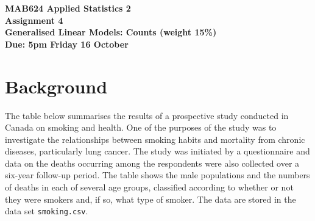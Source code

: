 \documentclass[11pt,a4paper]{article}
\begin{document}
\begin{center}
    \vspace*{0.35in}
    \huge\textbf{MAB624 Applied Statistics 2}\\
    \textbf{Assignment 4}\\
    \normalsize
    \vspace*{2em}
    \textbf{Generalised Linear Models: Counts (weight 15\%)}\\
    \textbf{Due: 5pm Friday 16 October}
\end{center}


\section*{Background}

The table below summarises the results of a prospective study conducted in Canada on smoking and health.  One of the purposes of the study was to investigate the relationships between smoking habits and mortality from chronic diseases, particularly lung cancer.  The study was initiated by a questionnaire and data on the deaths occurring among the respondents were also collected over a six-year follow-up period.  The table shows the male populations and the numbers of deaths in each of several age groups, classified according to whether or not they were smokers and, if so, what type of smoker.  The data are stored in the data set \texttt{smoking.csv}.
\end{document}
